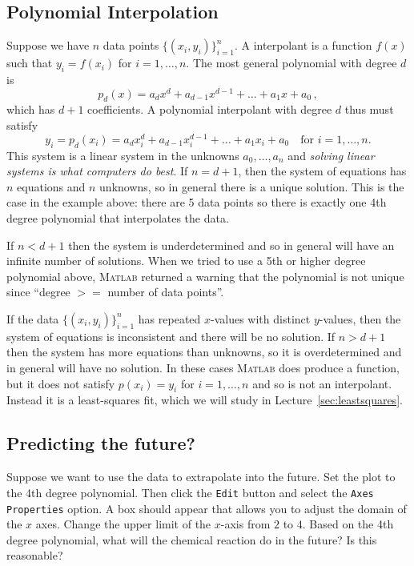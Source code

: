 
\subsection*{Polynomial Interpolation}

Suppose we have \(n\) data points \(\{(x_i,y_i)\}_{i=1}^n\).
A interpolant is a function \(f(x)\) such that 
\(y_i=f(x_i)\) for \(i=1,\dots,n\).
%
The most general  polynomial with degree $d$ is
$$
    p_d(x) = a_d x^d + a_{d-1} x^{d-1} + \ldots + a_1 x + a_0\,,
$$
which has \(d+1\) coefficients.
A polynomial interpolant with degree $d$ thus must satisfy
$$
    y_i=p_d(x_i) = a_d x_i^d + a_{d-1} x_i^{d-1} + \ldots + a_1 x_i +
    a_0
\quad\text{for \(i=1,\dots,n\).}
$$
This system is a linear system in the unknowns $a_0, \ldots, a_n$ and
{\em solving linear systems is what
computers do best}.
If \(n=d+1\),
then the system of equations has \(n\)
equations and \(n\)
unknowns, so in general there is a unique solution.
This is the case in the example above:
there are 5 data points so there is exactly one 4th degree polynomial
that interpolates the data.

If \(n < d+1\) then the system is underdetermined and so in general
will have an infinite number of solutions. 
When we tried to use a 5th or higher degree polynomial above,
\textsc{Matlab} returned a warning that the polynomial
is not unique since ``degree $>=$
number of data points''.

If the data \(\{(x_i,y_i)\}_{i=1}^n\) has repeated \(x\)-values with
distinct \(y\)-values, then the system of equations is inconsistent
and there will be no solution.
%
If \(n > d+1\) then the system has more equations than unknowns, so it
is overdetermined and in general will have no solution. 
%
In these cases \textsc{Matlab} does produce a function, but it does
not satisfy  \(p(x_i)=y_i\) for \(i=1,\dots,n\) and so is not an interpolant. 
Instead it is a least-squares fit, which we will study in
Lecture~\ref{sec:leastsquares}.



\subsection*{Predicting the future?}

Suppose we want to use the data to extrapolate into the future.
Set the plot to the 4th degree polynomial. Then click the \verb&Edit&
button and select the \verb&Axes Properties& option.
A box should appear that allows you to adjust the domain of the $x$
axes. Change the upper limit of the $x$-axis from $2$ to $4$.
Based on the 4th degree polynomial, what will the chemical reaction
do in the future? Is this reasonable?

